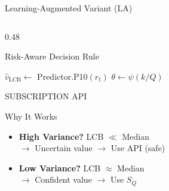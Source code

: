 \documentclass[aspectratio=169,10pt]{beamer}
\begin{document}
\begin{frame}{Learning-Augmented Variant (LA)}
\begin{columns}[T]
    \begin{column}{0.48\textwidth}
        \begin{exampleblock}{Risk-Aware Decision Rule}
        \begin{algorithmic}[1]
        \STATE $\hat{v}_{\text{LCB}} \gets$ Predictor.P10$(r_t)$
        \STATE $\theta \gets \psi(k/Q)$ 

            \RETURN SUBSCRIPTION
        \ELSE
            \RETURN API
        \ENDIF
        \end{algorithmic}
        \end{exampleblock}

        \vspace{0.2cm}
        \begin{alertblock}{Why It Works}
        \begin{itemize}
            \item \textbf{High Variance?} LCB $\ll$ Median\\
            $\to$ Uncertain value $\to$ Use API (safe)
            \item \textbf{Low Variance?} LCB $\approx$ Median\\
            $\to$ Confident value $\to$ Use $S_Q$
        \end{itemize}
        \end{alertblock}
    \end{column}
\end{columns}
\end{frame}
\end{document}
